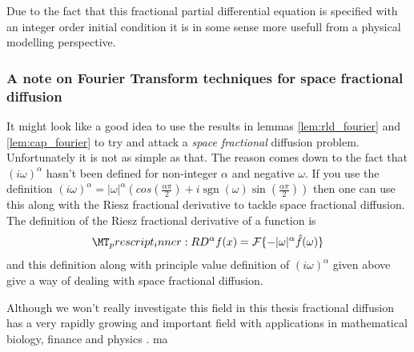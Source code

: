Due to the fact that this fractional partial differential equation is specified with an integer order initial condition it is in some sense more usefull from a physical modelling perspective. 

\subsubsection{A note on Fourier Transform techniques for space fractional diffusion}
It might look like a good idea to use the results in lemmas \ref{lem:rld_fourier} and \ref{lem:cap_fourier} to try and attack a \emph{space fractional} diffusion problem. Unfortunately it is not as simple as that. The reason comes down to the fact that $ (i\omega)^\alpha $ hasn't been defined for non-integer $ \alpha $ and negative $ \omega $. If you use the definition $  (i\omega)^\alpha = |\omega|^\alpha\left(cos\left(\frac{\alpha\pi}{2}\right) + i\operatorname{sgn}(\omega)\sin\left(\frac{\alpha\pi}{2}\right)\right) $ then one can use this along with the Riesz fractional derivative to tackle space fractional diffusion. The definition of the Riesz fractional derivative of a function is
\begin{align}
	\prescript{R}{}{D}^\alpha f(x) = \mathcal{F} \{ -|\omega|^\alpha \hat{f}(\omega) \}
\end{align}
and this definition along with principle value definition of $ (i\omega)^\alpha $ given above give a way of dealing with space fractional diffusion.

Although we won't really investigate this field in this thesis fractional diffusion has a very rapidly growing and important field with applications in mathematical biology, finance and physics \cite{Henry2010}.
ma
\clearpage
